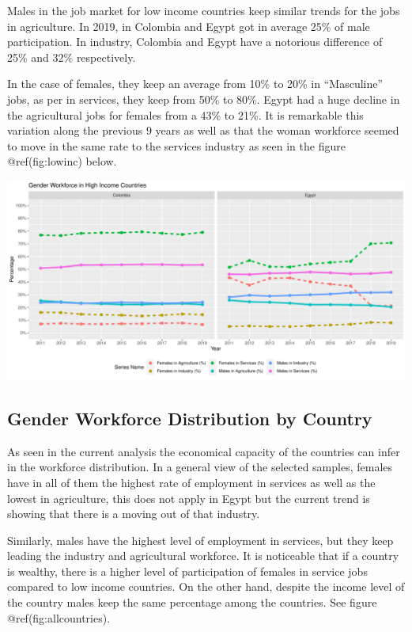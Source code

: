 \documentclass[
]{article}
\begin{document}
Males in the job market for low income countries keep similar trends for
the jobs in agriculture. In 2019, in Colombia and Egypt got in average
25\% of male participation. In industry, Colombia and Egypt have a
notorious difference of 25\% and 32\% respectively.

In the case of females, they keep an average from 10\% to 20\% in
``Masculine'' jobs, as per in services, they keep from 50\% to 80\%.
Egypt had a huge decline in the agricultural jobs for females from a
43\% to 21\%. It is remarkable this variation along the previous 9 years
as well as that the woman workforce seemed to move in the same rate to
the services industry as seen in the figure @ref(fig:lowinc) below.
\autocite{WDAgriculture}

\includegraphics{The_Outsiders_5513_files/figure-latex/lowinc-1.pdf}

\hypertarget{gender-workforce-distribution-by-country}{%
\subsection{Gender Workforce Distribution by
Country}\label{gender-workforce-distribution-by-country}}

As seen in the current analysis the economical capacity of the countries
can infer in the workforce distribution. In a general view of the
selected samples, females have in all of them the highest rate of
employment in services as well as the lowest in agriculture, this does
not apply in Egypt but the current trend is showing that there is a
moving out of that industry.

Similarly, males have the highest level of employment in services, but
they keep leading the industry and agricultural workforce. It is
noticeable that if a country is wealthy, there is a higher level of
participation of females in service jobs compared to low income
countries. On the other hand, despite the income level of the country
males keep the same percentage among the countries. See figure
@ref(fig:allcountries).
\end{document}
